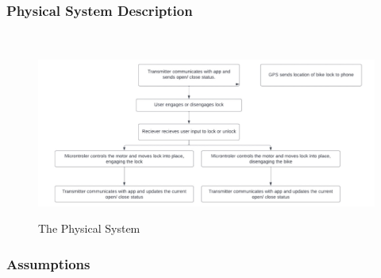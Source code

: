 \documentclass[12pt]{article}
\begin{document}
\subsubsection{Physical System Description} \label{sec_phySystDescrip}
~\newline
 \begin{figure}[h!]
 \begin{center}
 {
 \includegraphics[width=0.6\linewidth]{../FunctionalDiagram.jpeg}
 }
 \caption{\label{The Physical System} The Physical System}
 \end{center}
 \end{figure}

\subsubsection{Assumptions} \label{sec_assumpt}
\end{document}
